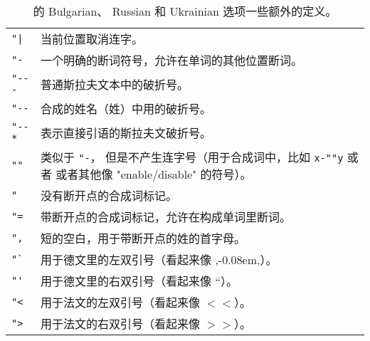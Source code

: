 \begin{table}[htb]
  \begin{center}
  \caption[保加利亚文、俄文和乌克兰文。]{ 的 Bulgarian、 Russian 和 Ukrainian 选项一些额外的定义。}\label{Cyrillic}
  \begin{tabular}{@{}p{.1\hsize}@{}p{.9\hsize}@{}}
   \hline
   \verb="|= & 当前位置取消连字。               \\
   \verb|"-| & 一个明确的断词符号，允许在单词的其他位置断词。        \\
   \verb|"---| & 普通斯拉夫文本中的破折号。                     \\
   \verb|"-- | & 合成的姓名（姓）中用的破折号。    \\
   \verb|"--*| & 表示直接引语的斯拉夫文破折号。        \\
   \verb|""| & 类似于 \verb|"-|， 但是不产生连字号（用于合成词中，比如 \verb|x-""y| 或者
                或者其他像 "enable/disable" 的符号）。 \\
   \verb|" | & 没有断开点的合成词标记。       \\
   \verb|"=| & 带断开点的合成词标记，允许在构成单词里断词。     \\
   \verb|",| & 短的空白，用于带断开点的姓的首字母。             \\
   \verb|"`| & 用于德文里的左双引号（看起来像 ,\kern-0.08em,）。 \\
   \verb|"'| & 用于德文里的右双引号（看起来像 ``）。       \\%
   \verb|"<| & 用于法文的左双引号（看起来像 $<\!\!<$）。 \\
   \verb|">| & 用于法文的右双引号（看起来像 $>\!\!>$）。 \\
   \hline
  \end{tabular}
  \end{center}
\end{table}


